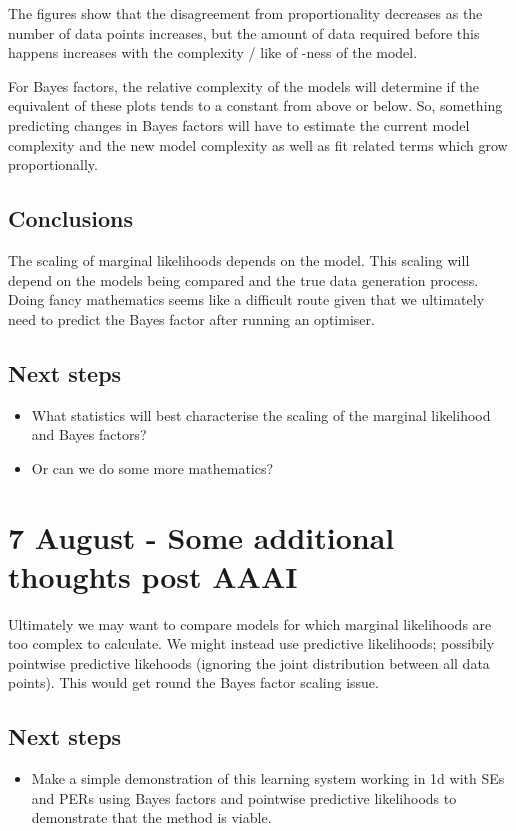 \documentclass[twoside,11pt]{article}
\begin{document}
The figures show that the disagreement from proportionality decreases as the number of data points increases, but the amount of data required before this happens increases with the complexity / like of \iid-ness of the model.

For Bayes factors, the relative complexity of the models will determine if the equivalent of these plots tends to a constant from above or below.
So, something predicting changes in Bayes factors will have to estimate the current model complexity and the new model complexity as well as fit related terms which grow proportionally.

\subsection{Conclusions}

The scaling of marginal likelihoods depends on the model.
This scaling will depend on the models being compared and the true data generation process.
Doing fancy mathematics seems like a difficult route given that we ultimately need to predict the Bayes factor after running an optimiser.

\subsection{Next steps}

\begin{itemize}
  \item What statistics will best characterise the scaling of the marginal likelihood and Bayes factors?
  \item Or can we do some more mathematics?
\end{itemize}

\section{7 August - Some additional thoughts post AAAI}

Ultimately we may want to compare models for which marginal likelihoods are too complex to calculate.
We might instead use predictive likelihoods; possibily pointwise predictive likehoods (ignoring the joint distribution between all data points).
This would get round the Bayes factor scaling issue.

\subsection{Next steps}

\begin{itemize}
  \item Make a simple demonstration of this learning system working in 1d with SEs and PERs using Bayes factors and pointwise predictive likelihoods to demonstrate that the method is viable.
\end{itemize}

\newpage


\vskip 0.2in

\end{document}
